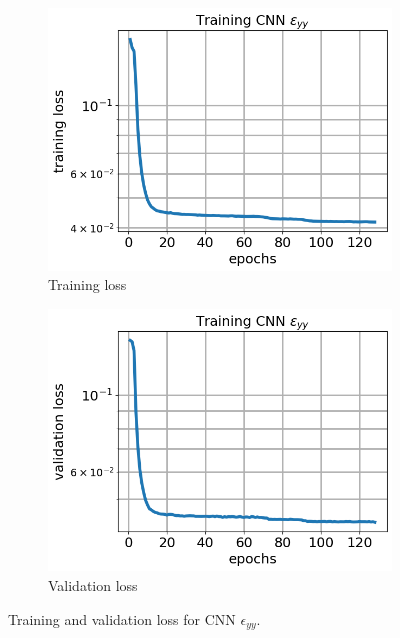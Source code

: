 \documentclass[12pt]{article}
\newcommand{\nhgfigheight}{4.0cm}
\begin{document}
\begin{figure}
  \centering
  \begin{subfigure}[b]{0.45\linewidth}
    \includegraphics[totalheight=\nhgfigheight]{Figures/final/training/eyy/field_strainyy_plot_loss.png}
    \caption{Training loss}
  \end{subfigure}
  \begin{subfigure}[b]{0.45\linewidth}
    \includegraphics[totalheight=\nhgfigheight]{Figures/final/training/eyy/field_strainyy_plot_val_loss.png}
    \caption{Validation loss}
  \end{subfigure}
\caption{\label{fig:oneinc:traineyy} Training and validation loss for CNN $\epsilon_{yy}$.}
\end{figure} 
\end{document}
